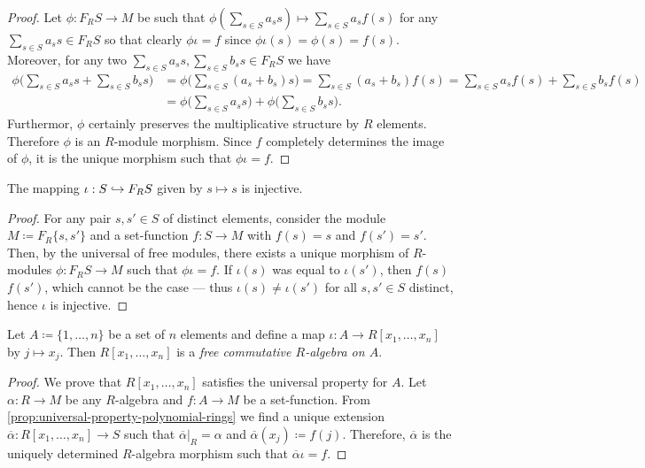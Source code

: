 \begin{proof}
Let \(\phi: F_R S \to M\) be such that
\(\phi(\sum_{s \in S} a_s s) \mapsto \sum_{s \in S} a_s f(s)\) for any
\(\sum_{s \in S} a_s s \in F_R S\) so that clearly \(\phi \iota = f\) since
\(\phi \iota(s) = \phi(s) = f(s)\). Moreover, for any two
\(\sum_{s \in S} a_s s, \sum_{s \in S} b_s s \in F_R S\) we have
\begin{align*}
\phi\bigg( \sum_{s \in S} a_s s + \sum_{s \in S} b_s s \bigg)
&= \phi\bigg( \sum_{s \in S} (a_s + b_s) s \bigg)
= \sum_{s \in S} (a_s + b_s) f(s)
= \sum_{s \in S} a_s f(s) + \sum_{s \in S} b_s f(s) \\
&= \phi\bigg( \sum_{s \in S} a_s s \bigg)
+ \phi\bigg( \sum_{s \in S} b_s s \bigg).
\end{align*}
Furthermor, \(\phi\) certainly preserves the multiplicative structure by \(R\)
elements. Therefore \(\phi\) is an \(R\)-module morphism. Since \(f\) completely
determines the image of \(\phi\), it is the unique morphism such that
\(\phi \iota = f\).
\end{proof}

\begin{corollary}
\label{cor:set-to-module-injective}
The mapping \(\iota: S \hookrightarrow F_R S\) given by \(s \mapsto s\) is injective.
\end{corollary}

\begin{proof}
For any pair \(s, s' \in S\) of distinct elements, consider the module
\(M \coloneq F_R \{s, s'\}\) and a set-function \(f: S \to M\) with \(f(s) = s\)
and \(f(s') = s'\). Then, by the universal of free modules, there exists a
unique morphism of \(R\)-modules \(\phi: F_R S \to M\) such that \(\phi \iota =
f\). If \(\iota(s)\) was equal to \(\iota(s')\), then \(f(s)\) \(f(s')\), which
cannot be the case --- thus \(\iota(s) \neq \iota(s')\) for all \(s, s' \in S\)
distinct, hence \(\iota\) is injective.
\end{proof}

\begin{proposition}
\label{prop:ring-poly-is-free-commutative-R-algebra}
Let \(A \coloneq \{1, \dots, n\}\) be a set of \(n\) elements and define a map
\(\iota: A \to R[x_1, \dots, x_n]\) by \(j \mapsto x_j\). Then \(R[x_1, \dots,
x_n]\) is a \emph{free commutative \(R\)-algebra on \(A\)}.
\end{proposition}

\begin{proof}
We prove that \(R[x_1, \dots, x_n]\) satisfies the universal property for
\(A\). Let \(\alpha: R \to M\) be any \(R\)-algebra and \(f: A \to M\) be a
set-function. From \cref{prop:universal-property-polynomial-rings} we find a
unique extension \(\overline{\alpha}: R[x_1, \dots, x_n] \to S\) such that
\(\overline{\alpha}|_R = \alpha\) and \(\overline{\alpha}(x_j) \coloneq
f(j)\). Therefore, \(\overline{\alpha}\) is the uniquely determined
\(R\)-algebra morphism such that \(\overline{\alpha} \iota = f\).
\end{proof}

